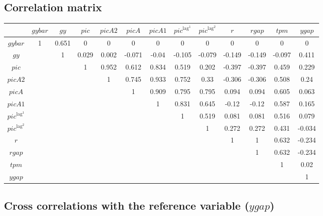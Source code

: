 \subsection{Correlation matrix}

\begin{tabular}{c|cccccccccccc|}
  & ${g\!y\!b\!a\!r}$ & ${g\!y}$ & ${p\!i\!c}$ & ${p\!i\!c\!A\!2}$ & ${p\!i\!c\!A}$ & ${p\!i\!c\!A\!1}$ & ${p\!i\!c}^{\mathrm{lag}^{\mathrm{1}}}$ & ${p\!i\!c}^{\mathrm{lag}^{\mathrm{2}}}$ & $r$ & ${r\!g\!a\!p}$ & ${t\!p\!m}$ & ${y\!g\!a\!p}$\\
\hline
${g\!y\!b\!a\!r}$ & 1 & 0.651 & 0 & 0 & 0 & 0 & 0 & 0 & 0 & 0 & 0 & 0 \\
${g\!y}$ &  & 1 & 0.029 & 0.002 & -0.071 & -0.04 & -0.105 & -0.079 & -0.149 & -0.149 & -0.097 & 0.411 \\
${p\!i\!c}$ &  &  & 1 & 0.952 & 0.612 & 0.834 & 0.519 & 0.202 & -0.397 & -0.397 & 0.459 & 0.229 \\
${p\!i\!c\!A\!2}$ &  &  &  & 1 & 0.745 & 0.933 & 0.752 & 0.33 & -0.306 & -0.306 & 0.508 & 0.24 \\
${p\!i\!c\!A}$ &  &  &  &  & 1 & 0.909 & 0.795 & 0.795 & 0.094 & 0.094 & 0.605 & 0.063 \\
${p\!i\!c\!A\!1}$ &  &  &  &  &  & 1 & 0.831 & 0.645 & -0.12 & -0.12 & 0.587 & 0.165 \\
${p\!i\!c}^{\mathrm{lag}^{\mathrm{1}}}$ &  &  &  &  &  &  & 1 & 0.519 & 0.081 & 0.081 & 0.516 & 0.079 \\
${p\!i\!c}^{\mathrm{lag}^{\mathrm{2}}}$ &  &  &  &  &  &  &  & 1 & 0.272 & 0.272 & 0.431 & -0.034 \\
$r$ &  &  &  &  &  &  &  &  & 1 & 1 & 0.632 & -0.234 \\
${r\!g\!a\!p}$ &  &  &  &  &  &  &  &  &  & 1 & 0.632 & -0.234 \\
${t\!p\!m}$ &  &  &  &  &  &  &  &  &  &  & 1 & 0.02 \\
${y\!g\!a\!p}$ &  &  &  &  &  &  &  &  &  &  &  & 1 \\
\hline
\end{tabular}


\subsection{Cross correlations with the reference variable (${y\!g\!a\!p}$)}

